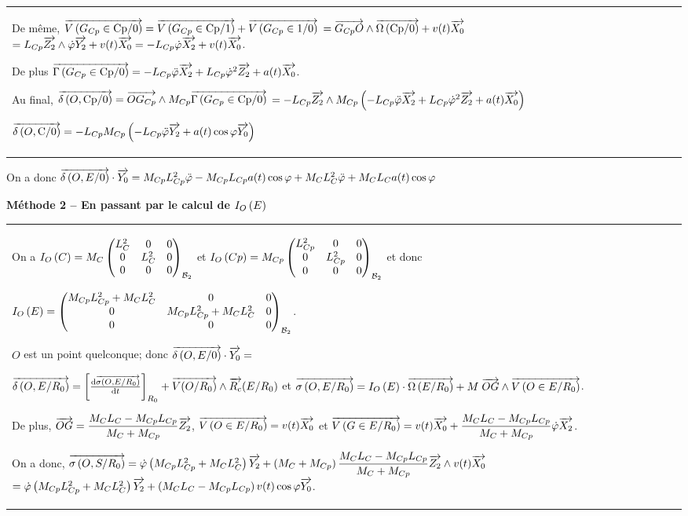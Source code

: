 \documentclass[10pt,fleqn]{article} %
\begin{document}
\begin{multicols}{2}
\begin{corrige}
\begin{tabular}{|p{.9\linewidth}}
De même, $\overrightarrow{V\left( {G_{Cp}} \in {\text{Cp}}/{0}\right)}=\overrightarrow{V\left( {G_{Cp}} \in {\text{Cp}}/{1}\right)}+\overrightarrow{V\left( {G_{Cp}} \in {\text{1}}/{0}\right)}$ $=\overrightarrow{G_{Cp}O}\wedge \overrightarrow{\Omega\left( {\text{Cp}}/{0}\right)}+v(t)\overrightarrow{X_0}$ $=L_{Cp}\overrightarrow{Z_2}\wedge \dot{\varphi}\overrightarrow{Y_2}+v(t)\overrightarrow{X_0}=-L_{Cp} \dot{\varphi}\overrightarrow{X_2}+v(t)\overrightarrow{X_0}$. 

De plus  $\overrightarrow{\Gamma \left( {G_{Cp}} \in {\text{Cp}}/{0}\right)}=-L_{Cp} \ddot{\varphi}\overrightarrow{X_2}+L_{Cp} \dot{\varphi}^2\overrightarrow{Z_2}+a(t)\overrightarrow{X_0}$. 

Au final, $\overrightarrow{\delta \left( {O}, {\text{Cp}} /{0}\right)} = \overrightarrow{OG_{Cp}} \wedge M_{Cp}\overrightarrow{\Gamma \left( {G_{Cp}} \in {\text{Cp}}/{0}\right)}$
$ =-L_{Cp}\overrightarrow{Z_2} \wedge M_{Cp} \left( -L_{Cp} \ddot{\varphi}\overrightarrow{X_2}+L_{Cp} \dot{\varphi}^2\overrightarrow{Z_2}+a(t)\overrightarrow{X_0}\right)$

$\overrightarrow{\delta \left( {O}, {\text{C}} /{0}\right)} =-L_{Cp} M_{Cp} \left( -L_{Cp} \ddot{\varphi}\overrightarrow{Y_2} +a(t)\cos\varphi\overrightarrow{Y_0} \right)$
\\
\end{tabular}

On a donc $\overrightarrow{\delta \left( {O}, {E} /{0}\right)}\cdot \overrightarrow{Y_0} =M_{Cp} L_{Cp}^2 \ddot{\varphi} -M_{Cp}L_{Cp}a(t)\cos\varphi +  M_CL_C^2 \ddot{\varphi} +M_CL_Ca(t) \cos \varphi $

\textbf{Méthode 2 -- En passant par le calcul de $I_{O}\left( E\right)$}

 \begin{tabular}{|p{.9\linewidth}}
On a $I_{O}\left( C\right)=M_C\begin{pmatrix} L_C^2 & 0 & 0 \\ 0 & L_C^2 & 0 \\ 0 & 0 & 0 \\ \end{pmatrix}_{\mathcal{B}_2}$ et $I_{O}\left( Cp\right)=M_{Cp}\begin{pmatrix} L_{Cp}^2 & 0 & 0 \\ 0 & L_{Cp}^2 & 0 \\ 0 & 0 & 0 \\ \end{pmatrix}_{\mathcal{B}_2}$ et donc 

$I_{O}\left( E\right)=\begin{pmatrix} M_{Cp}L_{Cp}^2+M_{C}L_{C}^2 & 0 & 0 \\ 0 & M_{Cp}L_{Cp}^2+M_{C}L_{C}^2 & 0 \\ 0 & 0 & 0 \\ \end{pmatrix}_{\mathcal{B}_2}$.

$O$ est un point quelconque; donc $\overrightarrow{\delta \left( {O}, {E} /{0}\right)}\cdot \overrightarrow{Y_0} =$

$\overrightarrow{\delta \left( {O}, {E} /{R_0}\right)}=\left[\frac{\text{d} \overrightarrow{\sigma \left( {O}, {E} /{R_0}\right)}}{\text{d} t}\right]_{R_0}+\overrightarrow{V(O/R_0)}\wedge \overrightarrow{R_c}(E/R_0)$ et 
$\overrightarrow{\sigma \left( {O}, {E} /{R_0}\right)}=I_{O}\left( E\right)\cdot \overrightarrow{\Omega\left( {E}/{R_0}\right)}+M\;\overrightarrow{OG}\wedge \overrightarrow{V\left( {O} \in {E}/{R_0}\right)}$. 

De plus, 
$\overrightarrow{OG}=\dfrac{M_CL_C-M_{Cp}L_{Cp}}{M_C+M_{Cp}}\overrightarrow{Z_2}$, $\overrightarrow{V\left( {O} \in {E}/{R_0}\right)}=v(t)\overrightarrow{X_0}$ et
$\overrightarrow{V\left( {G} \in {E}/{R_0}\right)}=v(t)\overrightarrow{X_0}+\dfrac{M_CL_C-M_{Cp}L_{Cp}}{M_C+M_{Cp}}\dot{\varphi}\overrightarrow{X_2}$.


On a donc, 
$\overrightarrow{\sigma \left( {O}, {S} /{R_0}\right)}=\dot{\varphi}\left(M_{Cp}L_{Cp}^2+M_{C}L_{C}^2 \right)\overrightarrow{Y_2}+\left( M_C+M_{Cp}\right) \dfrac{M_CL_C-M_{Cp}L_{Cp}}{M_C+M_{Cp}}\overrightarrow{Z_2}\wedge v(t)\overrightarrow{X_0}$
$ = \dot{\varphi}\left(M_{Cp}L_{Cp}^2+M_{C}L_{C}^2 \right)\overrightarrow{Y_2}+\left( M_CL_C-M_{Cp}L_{Cp}\right) v(t)\cos\varphi \overrightarrow{Y_0}$.


\end{tabular}
\end{corrige}
\end{multicols}
\end{document}
